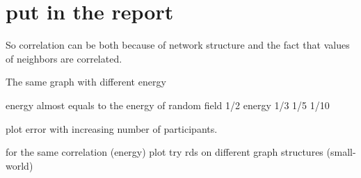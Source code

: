 \documentclass[12pt]{report}
\begin{document}
\section{put in the report}

























So correlation can be both because of network structure and the fact that values of neighbors are correlated.

The same graph with different energy

energy almost equals to the energy of random field
1/2 energy
1/3
1/5
1/10

 
plot error with increasing number of participants.


for the same correlation (energy) plot try rds on different graph structures
(small-world)
\end{document}
